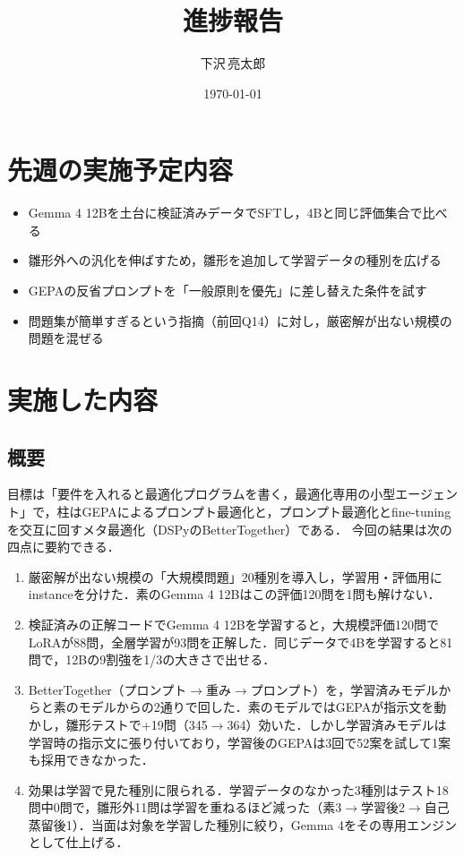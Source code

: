 \documentclass[12pt,a4paper]{article}
\title{進捗報告}
\author{下沢\,亮太郎}
\date{\today}
\begin{document}
\maketitle

\section{先週の実施予定内容}

\begin{itemize}
  \item Gemma 4 12Bを土台に検証済みデータでSFTし，4Bと同じ評価集合で比べる
  \item 雛形外への汎化を伸ばすため，雛形を追加して学習データの種別を広げる
  \item GEPAの反省プロンプトを「一般原則を優先」に差し替えた条件を試す
  \item 問題集が簡単すぎるという指摘（前回Q14）に対し，厳密解が出ない規模の問題を混ぜる
\end{itemize}


\section{実施した内容}

\subsection{概要}

目標は「要件を入れると最適化プログラムを書く，最適化専用の小型エージェント」で，柱はGEPAによるプロンプト最適化と，プロンプト最適化とfine-tuningを交互に回すメタ最適化（DSPyのBetterTogether）である．
今回の結果は次の四点に要約できる．

\begin{enumerate}
  \item 厳密解が出ない規模の「大規模問題」20種別を導入し，学習用・評価用にinstanceを分けた．素のGemma 4 12Bはこの評価120問を1問も解けない．
  \item 検証済みの正解コードでGemma 4 12Bを学習すると，大規模評価120問でLoRAが88問，全層学習が93問を正解した．同じデータで4Bを学習すると81問で，12Bの9割強を1/3の大きさで出せる．
  \item BetterTogether（プロンプト$\rightarrow$重み$\rightarrow$プロンプト）を，学習済みモデルからと素のモデルからの2通りで回した．素のモデルではGEPAが指示文を動かし，雛形テストで+19問（345$\rightarrow$364）効いた．しかし学習済みモデルは学習時の指示文に張り付いており，学習後のGEPAは3回で52案を試して1案も採用できなかった．
  \item 効果は学習で見た種別に限られる．学習データのなかった3種別はテスト18問中0問で，雛形外11問は学習を重ねるほど減った（素3$\rightarrow$学習後2$\rightarrow$自己蒸留後1）．当面は対象を学習した種別に絞り，Gemma 4をその専用エンジンとして仕上げる．
\end{enumerate}
\end{document}

